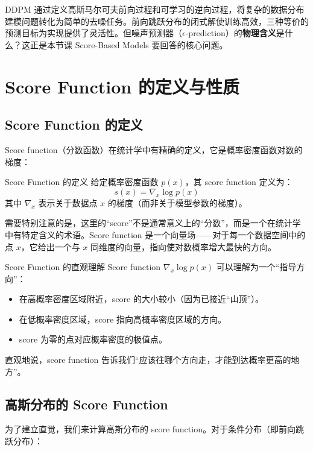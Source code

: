 \documentclass[a4paper]{article}
\begin{document}
DDPM 通过定义高斯马尔可夫前向过程和可学习的逆向过程，将复杂的数据分布建模问题转化为简单的去噪任务。前向跳跃分布的闭式解使训练高效，三种等价的预测目标为实现提供了灵活性。但噪声预测器（$\epsilon$-prediction）的\textbf{物理含义}是什么？这正是本节课 Score-Based Models 要回答的核心问题。

\section{Score Function 的定义与性质}

\subsection{Score Function 的定义}

Score function（分数函数）在统计学中有精确的定义，它是概率密度函数对数的梯度：

\begin{importantbox}{Score Function 的定义}
给定概率密度函数 $p(x)$，其 score function 定义为：
$$s(x) = \nabla_x \log p(x)$$
其中 $\nabla_x$ 表示关于数据点 $x$ 的梯度（而非关于模型参数的梯度）。
\end{importantbox}

需要特别注意的是，这里的``score''不是通常意义上的``分数''，而是一个在统计学中有特定含义的术语。Score function 是一个向量场——对于每一个数据空间中的点 $x$，它给出一个与 $x$ 同维度的向量，指向使对数概率增大最快的方向。

\begin{knowledgebox}{Score Function 的直观理解}
Score function $\nabla_x \log p(x)$ 可以理解为一个``指导方向''：
\begin{itemize}
    \item 在高概率密度区域附近，score 的大小较小（因为已接近``山顶''）。
    \item 在低概率密度区域，score 指向高概率密度区域的方向。
    \item score 为零的点对应概率密度的极值点。
\end{itemize}
直观地说，score function 告诉我们``应该往哪个方向走，才能到达概率更高的地方''。
\end{knowledgebox}

\subsection{高斯分布的 Score Function}

为了建立直觉，我们来计算高斯分布的 score function。对于条件分布（即前向跳跃分布）：
\end{document}
